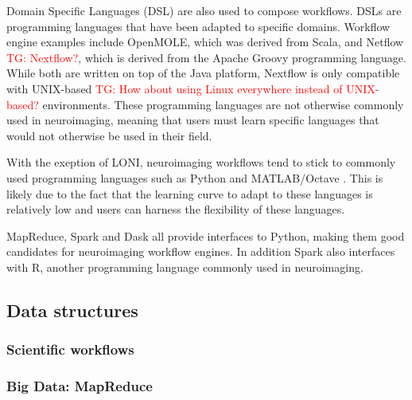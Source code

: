 \documentclass{report}
\newcommand{\tristan}[1]{\textcolor{red}{TG: #1}}
\begin{document}
            Domain Specific Languages (DSL) are also used to compose workflows.
            DSLs are programming languages that have been adapted to specific
            domains. Workflow engine examples include OpenMOLE, which was 
            derived from Scala, and Netflow \tristan{Nextflow?}, which is derived from the Apache 
            Groovy programming language. While both are written on top of the 
            Java platform, Nextflow is only compatible with UNIX-based \tristan{How about using Linux everywhere instead of UNIX-based?} 
            environments. These programming languages are not otherwise commonly
            used in neuroimaging, meaning that users must learn specific 
            languages that would not otherwise be used in their field.

            With the exeption of LONI, neuroimaging workflows tend to stick to
            commonly used programming languages such as Python and MATLAB/Octave
            . This is likely due to the fact that the learning curve to adapt to
            these languages is relatively low and users can harness the 
            flexibility of these languages. 
            
            MapReduce, Spark and Dask all provide interfaces to Python, making 
            them good candidates for neuroimaging workflow engines. In addition
            Spark also interfaces with R, another programming language commonly
            used in neuroimaging.

            \subsection{Data structures}
                \subsubsection{Scientific workflows}
                \subsubsection{Big Data: MapReduce}
            
\end{document}
